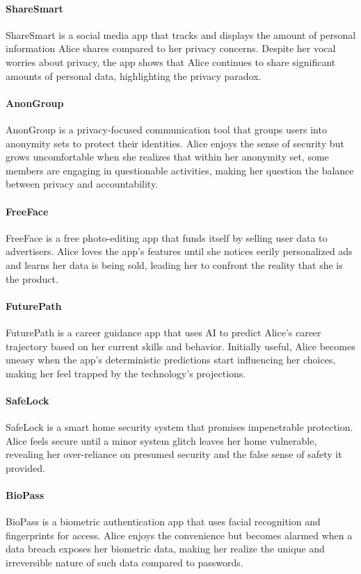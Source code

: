 \paragraph{ShareSmart}
ShareSmart is a social media app that tracks and displays the amount of personal information Alice shares compared to her privacy concerns. Despite her vocal worries about privacy, the app shows that Alice continues to share significant amounts of personal data, highlighting the privacy paradox.

\paragraph{AnonGroup}
AnonGroup is a privacy-focused communication tool that groups users into anonymity sets to protect their identities. Alice enjoys the sense of security but grows uncomfortable when she realizes that within her anonymity set, some members are engaging in questionable activities, making her question the balance between privacy and accountability.

\paragraph{FreeFace}
FreeFace is a free photo-editing app that funds itself by selling user data to advertisers. Alice loves the app's features until she notices eerily personalized ads and learns her data is being sold, leading her to confront the reality that she is the product.

\paragraph{FuturePath}
FuturePath is a career guidance app that uses AI to predict Alice's career trajectory based on her current skills and behavior. Initially useful, Alice becomes uneasy when the app's deterministic predictions start influencing her choices, making her feel trapped by the technology's projections.

\paragraph{SafeLock}
SafeLock is a smart home security system that promises impenetrable protection. Alice feels secure until a minor system glitch leaves her home vulnerable, revealing her over-reliance on presumed security and the false sense of safety it provided.

\paragraph{BioPass}
BioPass is a biometric authentication app that uses facial recognition and fingerprints for access. Alice enjoys the convenience but becomes alarmed when a data breach exposes her biometric data, making her realize the unique and irreversible nature of such data compared to passwords.

